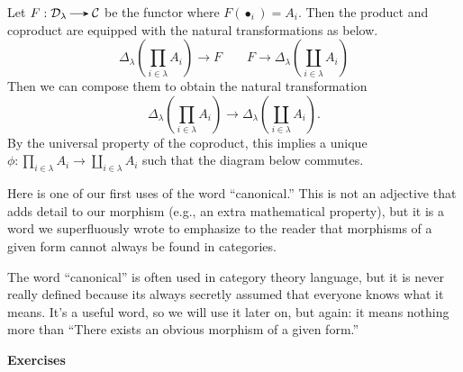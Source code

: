    \begin{prf}
        Let $F: \dd_{\lambda} \to \cc$ be the functor where $F(\bullet_i) = A_i$.
        Then the product and coproduct are equipped with the natural transformations as below. 
        \[
            \Delta_{\lambda}\left( \prod_{i \in \lambda}A_i \right) \to F
            \quad \quad
            F \to \Delta_{\lambda}\left( \coprod_{i \in \lambda}A_i \right)
        \]
        Then we can compose them to obtain the natural transformation
        \[
            \Delta_{\lambda}\left( \prod_{i \in \lambda}A_i \right) \to \Delta_{\lambda}\left( \coprod_{i \in \lambda}A_i \right).
        \]
        By the universal property of the coproduct, this implies a unique $\phi: \prod_{i \in \lambda}A_i \to \coprod_{i \in \lambda}A_i$
        such that the diagram below commutes. 

    \end{prf}

    \begin{remark}
        Here is one of our first uses of the word ``canonical.'' This is not an adjective 
        that adds detail to our morphism (e.g., an extra mathematical property),
        but it is a word we superfluously wrote to emphasize to the reader 
        that morphisms of a given form cannot always be found in categories. 

        The word ``canonical'' is often used in category theory language, but it is never really defined 
        because its always secretly assumed that everyone knows what it means. 
        It's a useful word, so we will use it later on, but again: it means nothing 
        more than ``There exists an obvious morphism of a given form.''
    \end{remark}

    {\large \textbf{Exercises}
    \vspace{0.5cm}}


